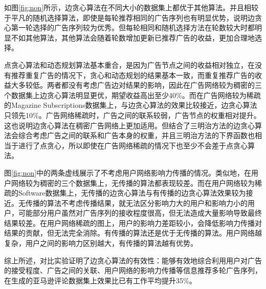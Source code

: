 如图\ref{fig:non}所示，边贪心算法在不同大小的数据集上都优于其他算法。并且相较于平凡的随机选择算法，即使是每轮推荐相同的广告序列也有明显优势，说明边贪心第一轮选择的广告序列较为优秀。但每轮相同和随机选择方法在轮数较大时都明显不如其他算法，其他算法会随着轮数增加更新已推荐广告的收益，更加合理地选择。

点贪心算法和动态规划算法基本重合，是因为广告节点之间的收益相对独立，在没有推荐重复广告的情况下，贪心和动态规划的结果基本一致，而重复推荐广告的收益大多较低。两者都没有考虑广告边对结果的影响，因此在广告网络较为稠密的三个数据集上边贪心算法明显更优，期望收益高出至少40\%。而在广告网络较为稀疏的Magazine Subscriptions数据集上，与边贪心算法的效果比较接近，边贪心算法只领先10\%。广告网络稀疏时，广告之间的联系较弱，广告节点的权重相对提升。这也说明边贪心算法在稠密广告网络上更加适用。但结合了三明治方法的边贪心算法会综合考虑广告之间的联系和广告本身的权重，并且三明治方法的下界函数也相当于进行了点贪心，所以即使在广告网络稀疏的情况下也至少不会差于点贪心算法。

图\ref{fig:non}中的两条虚线展示了不考虑用户网络影响力传播的情况。类似地，在用户网络较为稠密的三个数据集上，无传播的算法都表现较差。而在用户网络较为稀疏的Software数据集上，无传播的边贪心算法与有传播的边贪心算法效果较为接近。无传播的算法不考虑传播结果，就无法区分影响力大的用户和影响力小的用户，可能部分用户虽然对广告序列的接收程度很高，但无法造成大量影响导致最终结果较差。在用户网络稀疏的图上，用户的影响力差距较小，会降低影响力传播对结果的贡献，但无法完全消除。有传播的算法还是优于无传播的算法。用户网络越复杂，用户之间的影响力区别越大，有传播的算法越有优势。

综上所述，对比实验证明了边贪心算法的有效性：能够有效地综合利用用户对广告的接受程度、广告之间的关联、用户网络的影响力传播等信息推荐多轮广告序列，在生成的亚马逊评论数据集上效果比已有工作平均提升35\%。

